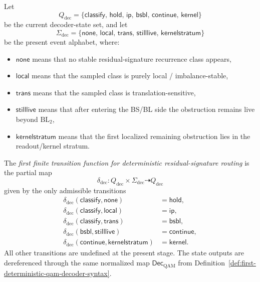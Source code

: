 \begin{definition}
\label{def:first-finite-transition-function-deterministic-decoder}
Let
\[
Q_{\mathrm{dec}}=\bigl\{\mathsf{classify},\,\mathsf{hold},\,\mathsf{ip},\,\mathsf{bsbl},\,\mathsf{continue},\,\mathsf{kernel}\bigr\}
\]
be the current decoder-state set, and let
\[
\Sigma_{\mathrm{dec}}=\bigl\{\mathsf{none},\,\mathsf{local},\,\mathsf{trans},\,\mathsf{stilllive},\,\mathsf{kernelstratum}\bigr\}
\]
be the present event alphabet, where:
\begin{itemize}[leftmargin=2em]
 \item \(\mathsf{none}\) means that no stable residual-signature recurrence class appears,
 \item \(\mathsf{local}\) means that the sampled class is purely local / imbalance-stable,
 \item \(\mathsf{trans}\) means that the sampled class is translation-sensitive,
 \item \(\mathsf{stilllive}\) means that after entering the BS/BL side the obstruction remains live beyond \(\mathrm{BL}_2\),
 \item \(\mathsf{kernelstratum}\) means that the first localized remaining obstruction lies in the readout/kernel stratum.
\end{itemize}
The \emph{first finite transition function for deterministic residual-signature routing} is the partial map
\[
\delta_{\mathrm{dec}}:Q_{\mathrm{dec}}\times \Sigma_{\mathrm{dec}}\dashrightarrow Q_{\mathrm{dec}}
\]
given by the only admissible transitions
\[
\begin{aligned}
\delta_{\mathrm{dec}}(\mathsf{classify},\mathsf{none})&=\mathsf{hold},\\
\delta_{\mathrm{dec}}(\mathsf{classify},\mathsf{local})&=\mathsf{ip},\\
\delta_{\mathrm{dec}}(\mathsf{classify},\mathsf{trans})&=\mathsf{bsbl},\\
\delta_{\mathrm{dec}}(\mathsf{bsbl},\mathsf{stilllive})&=\mathsf{continue},\\
\delta_{\mathrm{dec}}(\mathsf{continue},\mathsf{kernelstratum})&=\mathsf{kernel}.
\end{aligned}
\]
All other transitions are undefined at the present stage. The state outputs are dereferenced through the same normalized map \(\mathsf{Dec}_{\mathrm{QAM}}\) from Definition~\ref{def:first-deterministic-qam-decoder-syntax}.
\end{definition}

